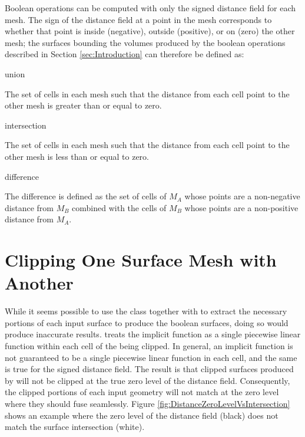 \documentclass{InsightArticle}
\begin{document}
Boolean operations can be computed with only the signed distance field for each mesh. The sign of the distance field at a point in the mesh corresponds to whether that point is inside (negative), outside (positive), or on (zero) the other mesh; the surfaces bounding the volumes produced by the boolean operations described in Section \ref{sec:Introduction} can therefore be defined as:

\begin{description}

\item union

The set of cells in each mesh such that the distance from each cell point to the other mesh is greater than or equal to zero.

\item intersection

The set of cells in each mesh such that the distance from each cell point to the other mesh is less than or equal to zero.

\item difference

The difference is defined as the set of cells of $M_A$ whose points are a non-negative distance from $M_B$ combined with the cells of $M_B$ whose points are a non-positive distance from $M_A$.

\end{description}

\section{Clipping One Surface Mesh with Another}

While it seems possible to use the class  together with  to extract the necessary portions of each input surface to produce the boolean surfaces, doing so would produce inaccurate results.  treats the implicit function as a single piecewise linear function within each cell of the  being clipped. In general, an implicit function is not guaranteed to be a single piecewise linear function in each cell, and the same is true for the signed distance field. The result is that clipped surfaces produced by  will not be clipped at the true zero level of the distance field. Consequently, the clipped portions of each input geometry will not match at the zero level where they should fuse seamlessly. Figure \ref{fig:DistanceZeroLevelVsIntersection} shows an example where the zero level of the distance field (black) does not match the surface intersection (white). 
\end{document}
